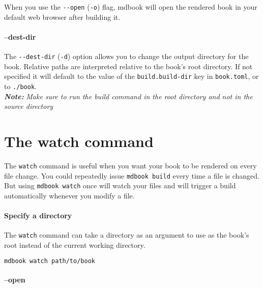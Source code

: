 \documentclass{article}
\begin{document}
When you use the \lstinline|--open| (\lstinline|-o|) flag, mdbook will open the rendered book in
your default web browser after building it.\\

\paragraph{--dest-dir}
\label{--dest-dir}
\label{dest-dir}

The \lstinline|--dest-dir| (\lstinline|-d|) option allows you to change the output directory for the
book. Relative paths are interpreted relative to the book's root directory. If
not specified it will default to the value of the \lstinline|build.build-dir| key in
\lstinline|book.toml|, or to \lstinline|./book|.\\

\emph{\textbf{Note:}} \emph{Make sure to run the build command in the root directory and not in
the source directory}\\

\section{The watch command}
\label{The watch command}
\label{the-watch-command}

The \lstinline|watch| command is useful when you want your book to be rendered on every
file change. You could repeatedly issue \lstinline|mdbook build| every time a file is
changed. But using \lstinline|mdbook watch| once will watch your files and will trigger a
build automatically whenever you modify a file.\\

\paragraph{Specify a directory}
\label{Specify a directory}
\label{specify-a-directory}

The \lstinline|watch| command can take a directory as an argument to use as the book's
root instead of the current working directory.\\
\begin{lstlisting}[language=bash]
mdbook watch path/to/book

\end{lstlisting}

\paragraph{--open}
\label{--open}
\label{open}
\end{document}
